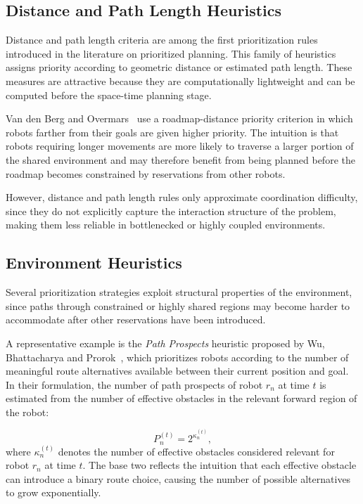 \subsection{Distance and Path Length Heuristics}
\hspace{\parindent}
Distance and path length criteria are among the first prioritization rules introduced in the
literature on prioritized planning. This family of heuristics assigns priority according to
geometric distance or estimated path length. These measures are attractive because they are
computationally lightweight and can be computed before the space-time planning stage.

Van den Berg and Overmars~\cite{vandenberg2005prioritized} use a roadmap-distance priority
criterion in which robots farther from their goals are given higher priority. The intuition is
that robots requiring longer movements are more likely to traverse a larger portion of the shared
environment and may therefore benefit from being planned before the roadmap becomes constrained by
reservations from other robots.

However, distance and path length rules only approximate coordination difficulty, since they do not explicitly capture the interaction structure of the problem, making them less reliable in bottlenecked or highly coupled environments.

\subsection{Environment Heuristics}
\hspace{\parindent}
Several prioritization strategies exploit structural properties of the environment, since paths
through constrained or highly shared regions may become harder to accommodate after other
reservations have been introduced.

A representative example is the \emph{Path Prospects} heuristic proposed by Wu, Bhattacharya and
Prorok~\cite{wu2020pathprospects}, which prioritizes robots according to the number of meaningful
route alternatives available between their current position and goal. In their formulation, the
number of path prospects of robot \(r_n\) at time \(t\) is estimated from the number of effective
obstacles in the relevant forward region of the robot:

\begin{equation}
    P_n^{(t)} = 2^{\kappa_n^{(t)}},
\end{equation}
where \(\kappa_n^{(t)}\) denotes the number of effective obstacles considered relevant for robot
\(r_n\) at time \(t\). The base two reflects the intuition that each effective obstacle can introduce a binary route
choice, causing the number of possible alternatives to grow exponentially.

